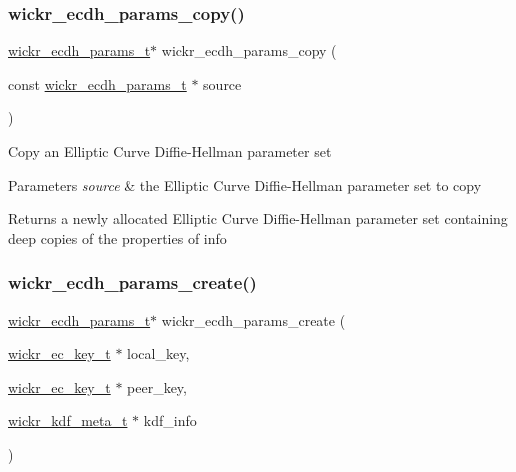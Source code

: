 \subsubsection{\texorpdfstring{wickr\+\_\+ecdh\+\_\+params\+\_\+copy()}{wickr\_ecdh\_params\_copy()}}
{\footnotesize\ttfamily \hyperlink{structwickr__ecdh__params}{wickr\+\_\+ecdh\+\_\+params\+\_\+t}$\ast$ wickr\+\_\+ecdh\+\_\+params\+\_\+copy (\begin{DoxyParamCaption}\item[{const \hyperlink{structwickr__ecdh__params}{wickr\+\_\+ecdh\+\_\+params\+\_\+t} $\ast$}]{source }\end{DoxyParamCaption})}

Copy an Elliptic Curve Diffie-\/\+Hellman parameter set


\begin{DoxyParams}{Parameters}
{\em source} & the Elliptic Curve Diffie-\/\+Hellman parameter set to copy \\
\hline
\end{DoxyParams}
\begin{DoxyReturn}{Returns}
a newly allocated Elliptic Curve Diffie-\/\+Hellman parameter set containing deep copies of the properties of \textquotesingle{}info\textquotesingle{} 
\end{DoxyReturn}
\mbox{\label{group__wickr__ecdh__params_ga8a5be72f13caa4bf5ee99e16cc3b092f}} 
\subsubsection{\texorpdfstring{wickr\+\_\+ecdh\+\_\+params\+\_\+create()}{wickr\_ecdh\_params\_create()}}
{\footnotesize\ttfamily \hyperlink{structwickr__ecdh__params}{wickr\+\_\+ecdh\+\_\+params\+\_\+t}$\ast$ wickr\+\_\+ecdh\+\_\+params\+\_\+create (\begin{DoxyParamCaption}\item[{\hyperlink{structwickr__ec__key}{wickr\+\_\+ec\+\_\+key\+\_\+t} $\ast$}]{local\+\_\+key,  }\item[{\hyperlink{structwickr__ec__key}{wickr\+\_\+ec\+\_\+key\+\_\+t} $\ast$}]{peer\+\_\+key,  }\item[{\hyperlink{structwickr__kdf__meta}{wickr\+\_\+kdf\+\_\+meta\+\_\+t} $\ast$}]{kdf\+\_\+info }\end{DoxyParamCaption})}

